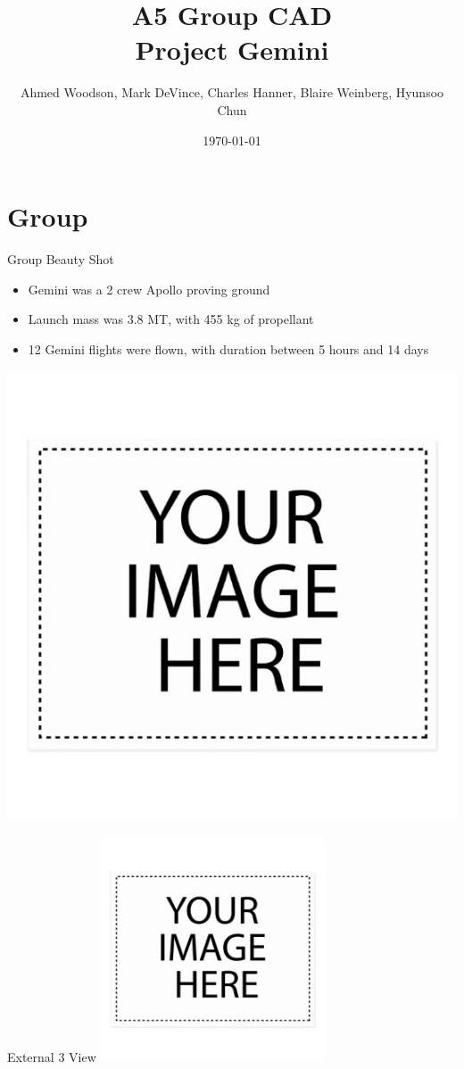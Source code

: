 \documentclass[10pt]{beamer}
\title{A5 Group CAD \\Project Gemini}
\author{Ahmed Woodson, Mark DeVince, Charles Hanner, Blaire Weinberg, Hyunsoo Chun}
\date{\today}
\begin{document}
	\frame{\titlepage}
	
\section{Group}
	
	\begin{frame}{Group Beauty Shot}
		\begin{minipage}{0.49\textwidth}
			\begin{itemize}
				\item Gemini was a 2 crew Apollo proving ground
				\item Launch mass was 3.8 MT, with 455 kg of propellant
				\item 12 Gemini flights were flown, with duration between 5 hours and 14 days
			\end{itemize}
		\end{minipage}%
		\begin{minipage}{0.49\textwidth}
			\includegraphics[width=\textwidth]{Group_Beauty.png}
		\end{minipage}
	\end{frame}

	\begin{frame}{External 3 View}
		\includegraphics[width=0.5\textwidth]{External_3_View.png}
	\end{frame}
\end{document}
